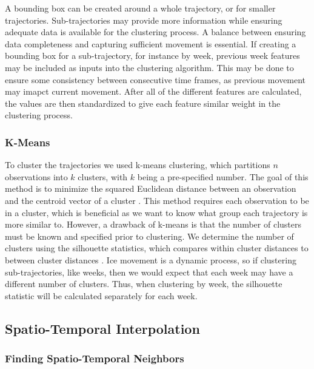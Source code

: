 \documentclass[12pt]{article}
\begin{document}
A bounding box can be created around a whole trajectory, or for smaller
trajectories. Sub-trajectories may provide more information while
ensuring adequate data is available for the clustering process. A
balance between ensuring data completeness and capturing sufficient
movement is essential. If creating a bounding box for a sub-trajectory,
for instance by week, previous week features may be included as inputs
into the clustering algorithm. This may be done to ensure some
consistency between consecutive time frames, as previous movement may
imapct current movement. After all of the different features are
calculated, the values are then standardized to give each feature
similar weight in the clustering process.

\hypertarget{k-means}{%
\subsubsection{K-Means}\label{k-means}}

To cluster the trajectories we used k-means clustering, which partitions
\(n\) observations into \(k\) clusters, with \(k\) being a pre-specified
number. The goal of this method is to minimize the squared Euclidean
distance between an observation and the centroid vector of a cluster
\citep{steinley_kmeans_2006}. This method requires each observation to
be in a cluster, which is beneficial as we want to know what group each
trajectory is more similar to. However, a drawback of k-means is that
the number of clusters must be known and specified prior to clustering.
We determine the number of clusters using the silhouette statistics,
which compares within cluster distances to between cluster distances
\citep{kodinariya_2013}. Ice movement is a dynamic process, so if
clustering sub-trajectories, like weeks, then we would expect that each
week may have a different number of clusters. Thus, when clustering by
week, the silhouette statistic will be calculated separately for each
week.

\hypertarget{spatio-temporal-interpolation}{%
\subsection{Spatio-Temporal
Interpolation}\label{spatio-temporal-interpolation}}

\hypertarget{finding-spatio-temporal-neighbors}{%
\subsubsection{Finding Spatio-Temporal
Neighbors}\label{finding-spatio-temporal-neighbors}}
\end{document}
